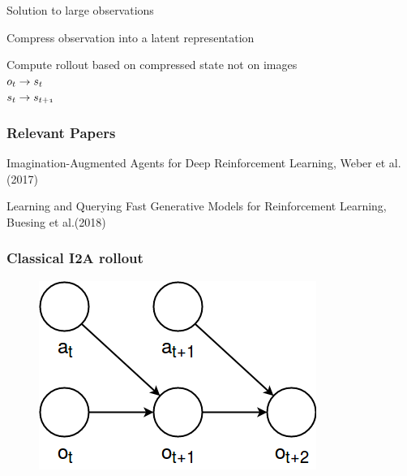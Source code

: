 \begin{frame}{Solution to large observations}
	\begin{PraesentationAufzaehlung}
	    \item Compress observation into a latent representation
	    \item Compute rollout based on compressed state not on images\\
	    $\mathnormal{o_t \rightarrow s_t}$\\
	    $\mathnormal{s_t \rightarrow s_{t+1}}$\\
	\end{PraesentationAufzaehlung}
\end{frame}


\begin{frame}
	\frametitle{Relevant Papers}
\begin{PraesentationAufzaehlung}
    \item Imagination-Augmented Agents for Deep Reinforcement Learning, Weber et al.(2017)
	\vspace{20mm}
    \item Learning and Querying Fast Generative Models for Reinforcement Learning, Buesing et al.(2018)
\end{PraesentationAufzaehlung}

\end{frame}
\clearpage


\begin{frame}
	\frametitle{Classical I2A rollout}
	\begin{figure}[h]
		\centering
		\includegraphics[height=0.5\textheight]{./latent_i2a_images/Classic_I2A_Rollout.png}
	\end{figure}
\end{frame}

